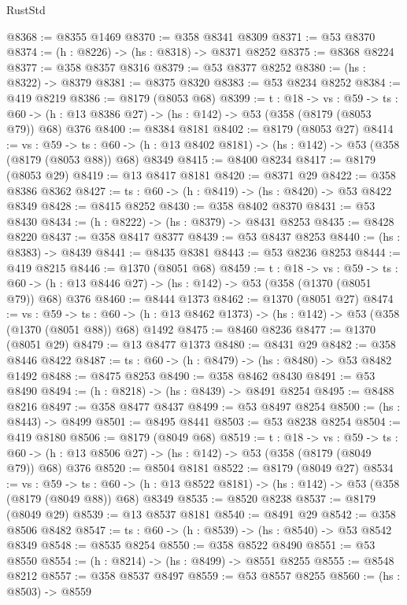 \begin{lexlean}{RustStd}
\begin{coremodule}
@8368 := @8355 @1469
@8370 := @358 @8341 @8309
@8371 := @53 @8370
@8374 := (h : @8226) -> (hs : @8318) -> @8371 @8252
@8375 := @8368 @8224
@8377 := @358 @8357 @8316
@8379 := @53 @8377 @8252
@8380 := (hs : @8322) -> @8379
@8381 := @8375 @8320
@8383 := @53 @8234 @8252
@8384 := @419 @8219
@8386 := @8179 (@8053 @68)
@8399 := {t : @18} ->
  {vs : @59} ->
  {ts : @60} -> (h : @13 @8386 @27) -> (hs : @142) -> @53 (@358 (@8179 (@8053 @79)) @68) @376
@8400 := @8384 @8181
@8402 := @8179 (@8053 @27)
@8414 := {vs : @59} ->
  {ts : @60} -> (h : @13 @8402 @8181) -> (hs : @142) -> @53 (@358 (@8179 (@8053 @88)) @68) @8349
@8415 := @8400 @8234
@8417 := @8179 (@8053 @29)
@8419 := @13 @8417 @8181
@8420 := @8371 @29
@8422 := @358 @8386 @8362
@8427 := {ts : @60} -> (h : @8419) -> (hs : @8420) -> @53 @8422 @8349
@8428 := @8415 @8252
@8430 := @358 @8402 @8370
@8431 := @53 @8430
@8434 := (h : @8222) -> (hs : @8379) -> @8431 @8253
@8435 := @8428 @8220
@8437 := @358 @8417 @8377
@8439 := @53 @8437 @8253
@8440 := (hs : @8383) -> @8439
@8441 := @8435 @8381
@8443 := @53 @8236 @8253
@8444 := @419 @8215
@8446 := @1370 (@8051 @68)
@8459 := {t : @18} ->
  {vs : @59} ->
  {ts : @60} -> (h : @13 @8446 @27) -> (hs : @142) -> @53 (@358 (@1370 (@8051 @79)) @68) @376
@8460 := @8444 @1373
@8462 := @1370 (@8051 @27)
@8474 := {vs : @59} ->
  {ts : @60} -> (h : @13 @8462 @1373) -> (hs : @142) -> @53 (@358 (@1370 (@8051 @88)) @68) @1492
@8475 := @8460 @8236
@8477 := @1370 (@8051 @29)
@8479 := @13 @8477 @1373
@8480 := @8431 @29
@8482 := @358 @8446 @8422
@8487 := {ts : @60} -> (h : @8479) -> (hs : @8480) -> @53 @8482 @1492
@8488 := @8475 @8253
@8490 := @358 @8462 @8430
@8491 := @53 @8490
@8494 := (h : @8218) -> (hs : @8439) -> @8491 @8254
@8495 := @8488 @8216
@8497 := @358 @8477 @8437
@8499 := @53 @8497 @8254
@8500 := (hs : @8443) -> @8499
@8501 := @8495 @8441
@8503 := @53 @8238 @8254
@8504 := @419 @8180
@8506 := @8179 (@8049 @68)
@8519 := {t : @18} ->
  {vs : @59} ->
  {ts : @60} -> (h : @13 @8506 @27) -> (hs : @142) -> @53 (@358 (@8179 (@8049 @79)) @68) @376
@8520 := @8504 @8181
@8522 := @8179 (@8049 @27)
@8534 := {vs : @59} ->
  {ts : @60} -> (h : @13 @8522 @8181) -> (hs : @142) -> @53 (@358 (@8179 (@8049 @88)) @68) @8349
@8535 := @8520 @8238
@8537 := @8179 (@8049 @29)
@8539 := @13 @8537 @8181
@8540 := @8491 @29
@8542 := @358 @8506 @8482
@8547 := {ts : @60} -> (h : @8539) -> (hs : @8540) -> @53 @8542 @8349
@8548 := @8535 @8254
@8550 := @358 @8522 @8490
@8551 := @53 @8550
@8554 := (h : @8214) -> (hs : @8499) -> @8551 @8255
@8555 := @8548 @8212
@8557 := @358 @8537 @8497
@8559 := @53 @8557 @8255
@8560 := (hs : @8503) -> @8559

\end{coremodule}
\end{lexlean}
